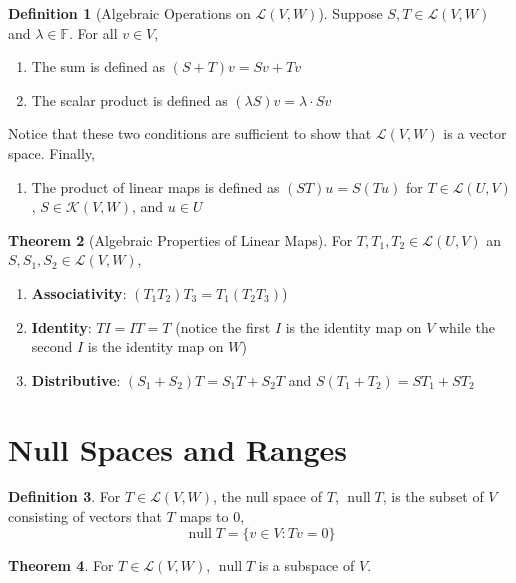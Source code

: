 \documentclass[12pt]{report}
\numberwithin{equation}{section}
\theoremstyle{definition}
\newtheorem{theorem}{Theorem}[section]
\newtheorem{definition}[theorem]{Definition}
\DeclareMathOperator{\nulll}{null}
\begin{document}
\begin{definition}[Algebraic Operations on $ \mathcal{L} (V,W)$]
	Suppose $ S,T\in\mathcal{L}(V,W) $ and $\lambda\in\mathbb{F}$. For all $ v\in V $,
	\begin{enumerate}
		\item The sum is defined as $ (S+T)v = Sv + Tv $
		\item The scalar product is defined as $ (\lambda S) v = \lambda\cdot Sv $
	\end{enumerate}
	Notice that these two conditions are sufficient to show that $ \mathcal{L}(V,W) $ is a vector space. Finally,
	\begin{enumerate}[start=3]
		\item The product of linear maps is defined as $ (ST) u = S(Tu) $ for $ T\in\mathcal{L}(U,V) $, $ S\in\mathcal{K}(V,W) $, and $ u\in U $
	\end{enumerate}
\end{definition}

\begin{theorem}[Algebraic Properties of Linear Maps] For $ T, T_1, T_2\in\mathcal{L}(U,V) $ an $ S, S_1, S_2\in\mathcal{L}(V,W) $,
	\begin{enumerate}
		\item \textbf{Associativity}: $ (T_1T_2)T_3 = T_1(T_2T_3)$)
		\item \textbf{Identity}: $ TI = IT = T $ (notice the first $ I $ is the identity map on $ V$ while the second $ I $ is the identity map on $ W $)
		\item \textbf{Distributive}: $ (S_1 + S_2) T = S_1T + S_2T $ and $ S(T_1 + T_2) = ST_1 + ST_2 $
	\end{enumerate}
\end{theorem}

\section{Null Spaces and Ranges}

\begin{definition}
	For $ T\in\mathcal{L}(V,W) $, the null space of $ T $, $ \nulll T $, is the subset of $ V $ consisting of vectors that $ T $ maps to 0,
	\begin{equation}
		\nulll T = \{v\in V : Tv = 0\}
	\end{equation}
\end{definition}

\begin{theorem}
	For $ T\in\mathcal{L}(V,W) $, $ \nulll T $ is a subspace of $ V $.
\end{theorem}
\end{document}
